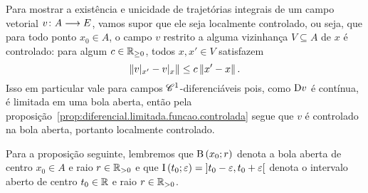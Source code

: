 Para mostrar a existência e unicidade de trajetórias integrais de um campo vetorial $v\colon \allowbreak A \longrightarrow E$, vamos supor que ele seja localmente controlado, ou seja, que para todo ponto $x_0 \in A$, o campo $v$ restrito a alguma vizinhança $V \subseteq A$ de $x$ é controlado: para algum $c \in \mathbb{R}_{\geq 0}$, todos $x,x' \in V$ satisfazem
	\begin{equation*}
	\left\Vert{v|_{x'} - v|_{x}}\right\Vert \leq c \left\Vert{x'-x}\right\Vert.
	\end{equation*}
Isso em particular vale para campos $\mathscr{C}^1$-diferenciáveis pois, como $\mathrm{D} v$ é contínua, é limitada em uma bola aberta, então pela proposição~\ref{prop:diferencial.limitada.funcao.controlada} segue que $v$ é controlado na bola aberta, portanto localmente controlado.

Para a proposição seguinte, lembremos que $\mathrm{B}\left(x_0; r\right)$ denota a bola aberta de centro $x_0 \in A$ e raio $r \in \mathbb{R}_{>0}$ e que $\mathrm{I}\left(t_0; \varepsilon\right) = \left]t_0-\varepsilon,\allowbreak t_0+\varepsilon\right[$ denota o intervalo aberto de centro $t_0 \in \mathbb{R}$ e raio $r \in \mathbb{R}_{>0}$.

